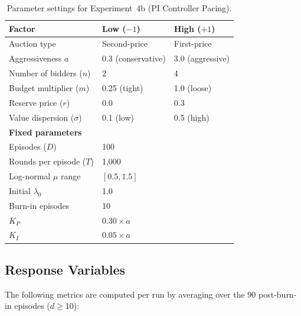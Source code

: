 \begin{table}[H]
\centering
\caption{Parameter settings for Experiment~4b (PI Controller Pacing).}
\label{tab:exp4bparams}
\begin{tabular}{l l l}
\toprule
\textbf{Factor} & \textbf{Low ($-1$)} & \textbf{High ($+1$)}\\
\midrule
Auction type & Second-price & First-price \\
Aggressiveness $a$ & 0.3 (conservative) & 3.0 (aggressive) \\
Number of bidders ($n$) & 2 & 4 \\
Budget multiplier ($m$) & 0.25 (tight) & 1.0 (loose) \\
Reserve price ($r$) & 0.0 & 0.3 \\
Value dispersion ($\sigma$) & 0.1 (low) & 0.5 (high) \\
\midrule
\multicolumn{3}{l}{\textbf{Fixed parameters}} \\
\midrule
Episodes ($D$) & \multicolumn{2}{l}{100} \\
Rounds per episode ($T$) & \multicolumn{2}{l}{1{,}000} \\
Log-normal $\mu$ range & \multicolumn{2}{l}{$[0.5, 1.5]$} \\
Initial $\lambda_0$ & \multicolumn{2}{l}{1.0} \\
Burn-in episodes & \multicolumn{2}{l}{10} \\
$K_P$ & \multicolumn{2}{l}{$0.30 \times a$} \\
$K_I$ & \multicolumn{2}{l}{$0.05 \times a$} \\
\bottomrule
\end{tabular}
\end{table}

\subsection{Response Variables}

The following metrics are computed per run by averaging over the 90 post-burn-in episodes ($d \geq 10$):

